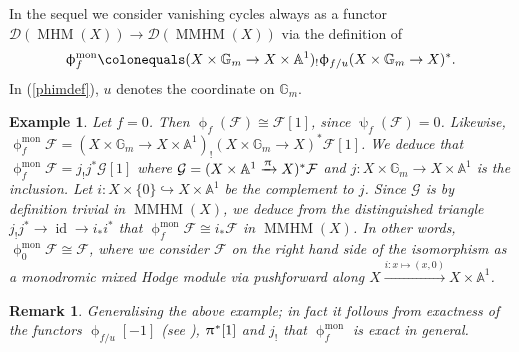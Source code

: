\documentclass[a4paper,10pt]{amsart}
\renewcommand{\pi}{\uppi\hspace{0.05em}}
\renewcommand{\phi}{\upphi}
\renewcommand{\psi}{\uppsi}
\newtheorem{example}[theorem]{Example}
\newtheorem{remark}[theorem]{Remark}
\renewcommand{\AA}{\mathbb{A}}
\newcommand{\GG}{\mathbb{G}}
\newcommand{\phim}[1]{\phi^{\mon}_{#1}}
\DeclareMathOperator{\mon}{mon}
\DeclareMathOperator{\MMHM}{MMHM}
\DeclareMathOperator{\MHM}{MHM}
\DeclareMathOperator{\id}{id}
\newcommand{\Dub}{\mathcal{D}}
\begin{document}
In the sequel we consider vanishing cycles always as a functor $\Dub(\MHM(X))\rightarrow\Dub(\MMHM(X))$ via the definition of \cite[Def.27]{KS2}
\begin{equation}
\label{phimdef}
\phim{f}\colonequals (X\times\GG_m\rightarrow X\times\mathbb{A}^1)_!\phi_{f/u}(X\times\GG_m\rightarrow X)^*.  
\end{equation}
In (\ref{phimdef}), $u$ denotes the coordinate on $\GG_m$.
\begin{example}
Let $f=0$.  Then $\phi_f(\mathcal{F})\cong\mathcal{F}[1]$, since $\psi_f(\mathcal{F})=0$.  Likewise, $\phim{f}\mathcal{F}=(X\times\GG_m\rightarrow X\times\mathbb{A}^1)_!(X\times\GG_m\rightarrow X)^*\mathcal{F}[1]$.  We deduce that $\phim{f}\mathcal{F}=j_!j^*\mathcal{G}[1]$ where $\mathcal{G}=(X\times\mathbb{A}^1\xrightarrow{\pi} X)^*\mathcal{F}$ and $j\colon X\times\GG_m\rightarrow X\times\AA^1$ is the inclusion.  Let $i\colon X\times \{0\}\hookrightarrow X\times\mathbb{A}^1$ be the complement to $j$.  Since $\mathcal{G}$ is by definition trivial in $\MMHM(X)$, we deduce from the distinguished triangle $j_!j^*\rightarrow \id\rightarrow i_*i^*$ that $\phim{f}\mathcal{F}\cong i_*\mathcal{F}$ in $\MMHM(X)$.  In other words, $\phim{0}\mathcal{F}\cong\mathcal{F}$, where we consider $\mathcal{F}$ on the right hand side of the isomorphism as a monodromic mixed Hodge module via pushforward along $X\xrightarrow{i\colon x\mapsto(x,0)} X\times\AA^1$.  
\end{example}
\begin{remark}
Generalising the above example; in fact it follows from exactness of the functors $\phi_{f/u}[-1]$ (see \cite{BBD}), $\pi^*[1]$ and $j_!$ that $\phim{f}$ is exact in general.
\end{remark}
\end{document}
